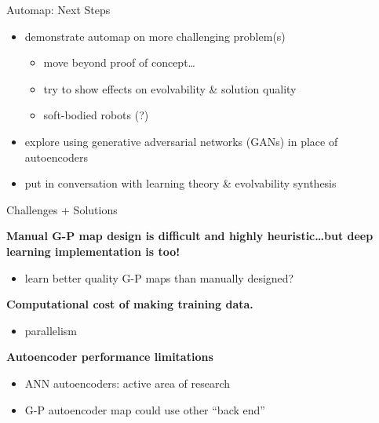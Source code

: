 \begin{frame}{Automap: Next Steps}

\begin{itemize}[<+->]
\item demonstrate automap on more challenging problem(s)
\begin{itemize}
\item move beyond proof of concept\dots
\item try to show effects on evolvability \& solution quality
\item soft-bodied robots (?)
\end{itemize}
\item explore using generative adversarial networks (GANs) in place of autoencoders
\item put in conversation with learning theory \& evolvability synthesis \cite{kouvaris2017evolution}
\end{itemize}

\end{frame}


\begin{frame}{Challenges + Solutions}

\textbf{Manual G-P map design is difficult and highly heuristic\dots but deep
learning implementation is too!}
\pause
\vspace{-1ex}
\begin{itemize}[<+->]
\itemsep0em
\item learn better quality G-P maps than manually designed?
\end{itemize}
\vspace{-1ex}
\pause


\textbf{Computational cost of making training data.}
\pause
\vspace{-1ex}
\begin{itemize}[<+->]
\itemsep0em
\item parallelism
\end{itemize}
\vspace{-1ex}
\pause


\textbf{Autoencoder performance limitations}
\pause
\vspace{-1ex}
\begin{itemize}[<+->]
\itemsep0em
\item ANN autoencoders: active area of research
\item G-P autoencoder map could use other ``back end''
\end{itemize}

\end{frame}

